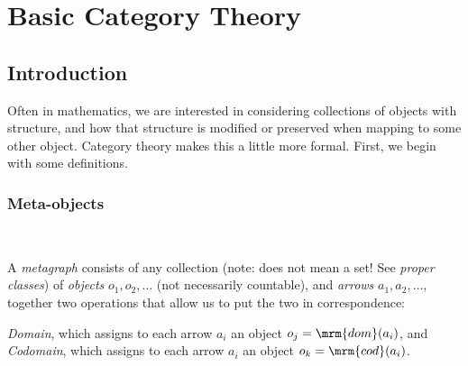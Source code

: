 \documentclass{fkbook}
\theoremstyle{snazzydefinition}
\begin{document}
\tableofcontents


\mainmatter
\pagestyle{main}

\chapter{Basic Category Theory}
\section{Introduction}
Often in mathematics, we are interested in considering collections of
objects with structure, and how that structure is modified or
preserved when mapping to some other object. Category theory makes
this a little more formal. First, we begin with some definitions.\\

\subsection{Meta-objects}~
\begin{definition}[Metagraph]
  A \emph{metagraph} consists of any collection (note: does not mean a
  set! See \emph{proper classes}) of \emph{objects} $o_1, o_2,
  \ldots$ (not necessarily countable), and \emph{arrows} $a_1, a_2,
  \ldots$, together two operations that allow us to put the two in
  correspondence:\\
\end{definition}
\begin{definition}
  \emph{Domain}, which assigns to each arrow $a_i$ an object $o_j =
  \mrm{dom}(a_i)$, and \emph{Codomain}, which assigns to each arrow
  $a_i$ an object $o_k = \mrm{cod}(a_i)$.
\end{definition}
\end{document}
